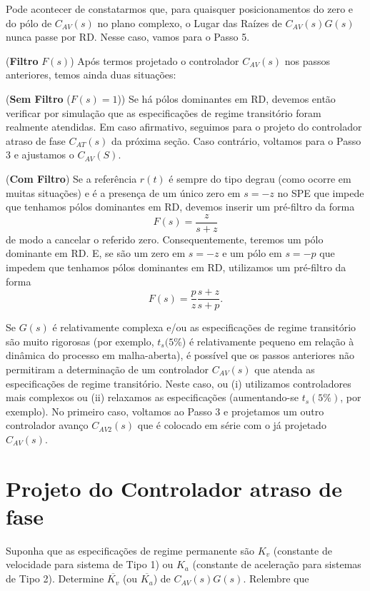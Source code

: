 \documentclass[
]{book}
\theoremstyle{definition}
\theoremstyle{definition}
\theoremstyle{definition}
\theoremstyle{remark}
\begin{document}
Pode acontecer de constatarmos que, para quaisquer posicionamentos do zero e do pólo de \(C_{AV}(s)\) no plano complexo, o Lugar das Raízes de \(C_{AV}(s)G(s)\) nunca passe por RD. Nesse caso, vamos para o Passo 5.

(\textbf{Filtro} \(F(s)\)) Após termos projetado o controlador \(C_{AV}(s)\) nos passos anteriores, temos ainda duas situações:

(\textbf{Sem Filtro} (\(F(s)=1\))) Se há pólos dominantes em RD, devemos então verificar por simulação que as especificações de regime transitório foram realmente atendidas. Em caso afirmativo, seguimos para o projeto do controlador atraso de fase \(C_{AT}(s)\) da próxima seção. Caso contrário, voltamos para o Passo 3 e ajustamos o \(C_{AV}(S)\).

(\textbf{Com Filtro}) Se a referência \(r(t)\) é sempre do tipo degrau (como ocorre em muitas situações) e é a presença de um único zero em \(s=-z\) no SPE que impede que tenhamos pólos dominantes em RD, devemos inserir um pré-filtro da forma
\[
    \boxed{F(s)=\frac{z}{s+z}}
    \]
de modo a cancelar o referido zero. Consequentemente, teremos um pólo dominante em RD. E, se são um zero em \(s=-z\) e um pólo em \(s=-p\) que impedem que tenhamos pólos dominantes em RD, utilizamos um pré-filtro da forma
\[
    F(s)=\frac{p}{z}\frac{s+z}{s+p}.
    \]

Se \(G(s)\) é relativamente complexa e/ou as especificações de regime transitório são muito rigorosas (por exemplo, \(t_s(5\%\)) é relativamente pequeno em relação à dinâmica do processo em malha-aberta), é possível que os passos anteriores não permitiram a determinação de um controlador \(C_{AV}(s)\) que atenda as especificações de regime transitório. Neste caso, ou (i) utilizamos controladores mais complexos ou (ii) relaxamos as especificações (aumentando-se \(t_s(5\%)\), por exemplo). No primeiro caso, voltamos ao Passo 3 e projetamos um outro controlador avanço \(C_{AV2}(s)\) que é colocado em série com o já projetado \(C_{AV}(s)\).

\hypertarget{projeto-do-controlador-atraso-de-fase}{%
\section{Projeto do Controlador atraso de fase}\label{projeto-do-controlador-atraso-de-fase}}

Suponha que as especificações de regime permanente são \(K_v\) (constante de velocidade para sistema de Tipo 1) ou \(K_a\) (constante de aceleração para sistemas de Tipo 2). Determine \(\overline{K_v}\) (ou \(\overline{K_a}\)) de \(C_{AV}(s)G(s)\). Relembre que
\end{document}
